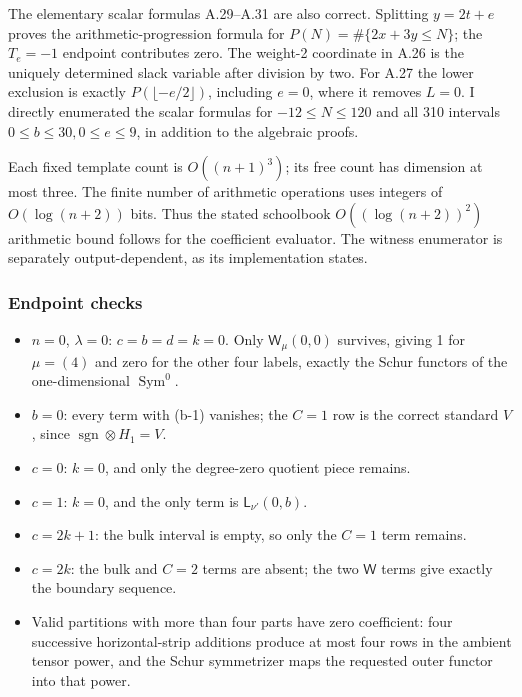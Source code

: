 \documentclass[
  10pt,
]{article}
\providecommand{\tightlist}{%
  \setlength{\itemsep}{0pt}\setlength{\parskip}{0pt}}
\providecommand{\tightlist}{\setlength{\itemsep}{0pt}\setlength{\parskip}{0pt}}
\begin{document}
The elementary scalar formulas A.29--A.31 are also correct. Splitting
\(y=2t+e\) proves the arithmetic-progression formula for
\(P(N)=\#\{2x+3y\le N\}\); the \(T_e=-1\) endpoint contributes zero. The
weight-2 coordinate in A.26 is the uniquely determined slack variable
after division by two. For A.27 the lower exclusion is exactly
\(P(\lfloor-e/2\rfloor)\), including \(e=0\), where it removes \(L=0\).
I directly enumerated the scalar formulas for \(-12\le N\le120\) and all
310 intervals \(0\le b\le30,0\le e\le9\), in addition to the algebraic
proofs.

Each fixed template count is \(O((n+1)^3)\); its free count has
dimension at most three. The finite number of arithmetic operations uses
integers of \(O(\log(n+2))\) bits. Thus the stated schoolbook
\(O((\log(n+2))^2)\) arithmetic bound follows for the coefficient
evaluator. The witness enumerator is separately output-dependent, as its
implementation states.

\subsubsection{Endpoint checks}\label{endpoint-checks}

\begin{itemize}
\tightlist
\item
  \(n=0\), \(\lambda=0\): \(c=b=d=k=0\). Only \(\mathsf W_\mu(0,0)\)
  survives, giving 1 for \(\mu=(4)\) and zero for the other four labels,
  exactly the Schur functors of the one-dimensional
  \(\operatorname{Sym}^0\).
\item
  \(b=0\): every term with (b-1) vanishes; the \(C=1\) row is the
  correct standard \(V\), since \(\operatorname{sgn}\otimes H_1=V\).
\item
  \(c=0\): \(k=0\), and only the degree-zero quotient piece remains.
\item
  \(c=1\): \(k=0\), and the only term is \(\mathsf L_{\nu'}(0,b)\).
\item
  \(c=2k+1\): the bulk interval is empty, so only the \(C=1\) term
  remains.
\item
  \(c=2k\): the bulk and \(C=2\) terms are absent; the two \(\mathsf W\)
  terms give exactly the boundary sequence.
\item
  Valid partitions with more than four parts have zero coefficient: four
  successive horizontal-strip additions produce at most four rows in the
  ambient tensor power, and the Schur symmetrizer maps the requested
  outer functor into that power.
\end{itemize}
\end{document}
